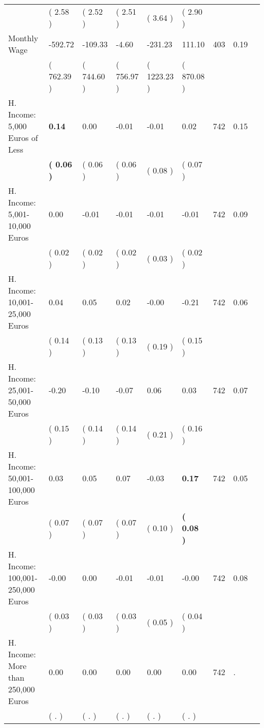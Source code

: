 \begin{tabular}{L{6.2cm} C{1.8cm} C{1.8cm} C{1.8cm} C{1.8cm} C{1.8cm} C{1.8cm} C{0.3cm} C{0.3cm}}
 & (     2.58 ) & (     2.52 ) & (     2.51 ) & (     3.64 ) & (     2.90 )  & \\
Monthly Wage &   -592.72 &   -109.33 &     -4.60 &   -231.23 &    111.10  & 403 &       0.19 \\ 
 & (   762.39 ) & (   744.60 ) & (   756.97 ) & (  1223.23 ) & (   870.08 )  & \\
H. Income: 5,000 Euros of Less & \textbf{     0.14} &      0.00 &     -0.01 &     -0.01 &      0.02  & 742 &       0.15 \\ 
 & \textbf{(     0.06 )} & (     0.06 ) & (     0.06 ) & (     0.08 ) & (     0.07 )  & \\
H. Income: 5,001-10,000 Euros &      0.00 &     -0.01 &     -0.01 &     -0.01 &     -0.01  & 742 &       0.09 \\ 
 & (     0.02 ) & (     0.02 ) & (     0.02 ) & (     0.03 ) & (     0.02 )  & \\
H. Income: 10,001-25,000 Euros &      0.04 &      0.05 &      0.02 &     -0.00 &     -0.21  & 742 &       0.06 \\ 
 & (     0.14 ) & (     0.13 ) & (     0.13 ) & (     0.19 ) & (     0.15 )  & \\
H. Income: 25,001-50,000 Euros &     -0.20 &     -0.10 &     -0.07 &      0.06 &      0.03  & 742 &       0.07 \\ 
 & (     0.15 ) & (     0.14 ) & (     0.14 ) & (     0.21 ) & (     0.16 )  & \\
H. Income: 50,001-100,000 Euros &      0.03 &      0.05 &      0.07 &     -0.03 & \textbf{     0.17}  & 742 &       0.05 \\ 
 & (     0.07 ) & (     0.07 ) & (     0.07 ) & (     0.10 ) & \textbf{(     0.08 )}  & \\
H. Income: 100,001-250,000 Euros &     -0.00 &      0.00 &     -0.01 &     -0.01 &     -0.00  & 742 &       0.08 \\ 
 & (     0.03 ) & (     0.03 ) & (     0.03 ) & (     0.05 ) & (     0.04 )  & \\
H. Income: More than 250,000 Euros &      0.00 &      0.00 &      0.00 &      0.00 &      0.00  & 742 &          . \\ 
 & (        . ) & (        . ) & (        . ) & (        . ) & (        . )  & \\
\bottomrule
\end{tabular}
